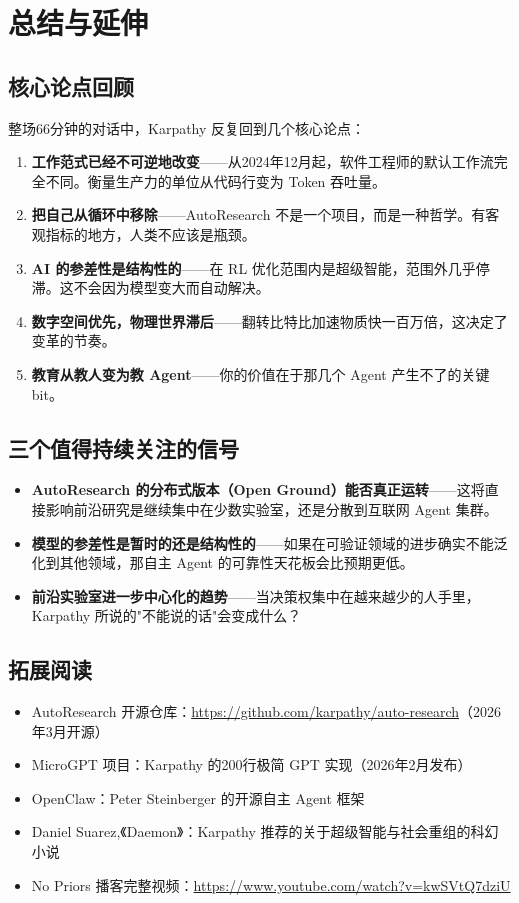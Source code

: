 \section{总结与延伸}

\subsection{核心论点回顾}

整场66分钟的对话中，Karpathy 反复回到几个核心论点：

\begin{enumerate}
    \item \textbf{工作范式已经不可逆地改变}——从2024年12月起，软件工程师的默认工作流完全不同。衡量生产力的单位从代码行变为 Token 吞吐量。
    \item \textbf{把自己从循环中移除}——AutoResearch 不是一个项目，而是一种哲学。有客观指标的地方，人类不应该是瓶颈。
    \item \textbf{AI 的参差性是结构性的}——在 RL 优化范围内是超级智能，范围外几乎停滞。这不会因为模型变大而自动解决。
    \item \textbf{数字空间优先，物理世界滞后}——翻转比特比加速物质快一百万倍，这决定了变革的节奏。
    \item \textbf{教育从教人变为教 Agent}——你的价值在于那几个 Agent 产生不了的关键 bit。
\end{enumerate}

\subsection{三个值得持续关注的信号}

\begin{itemize}
    \item \textbf{AutoResearch 的分布式版本（Open Ground）能否真正运转}——这将直接影响前沿研究是继续集中在少数实验室，还是分散到互联网 Agent 集群。
    \item \textbf{模型的参差性是暂时的还是结构性的}——如果在可验证领域的进步确实不能泛化到其他领域，那自主 Agent 的可靠性天花板会比预期更低。
    \item \textbf{前沿实验室进一步中心化的趋势}——当决策权集中在越来越少的人手里，Karpathy 所说的"不能说的话"会变成什么？
\end{itemize}

\subsection{拓展阅读}

\begin{itemize}
    \item AutoResearch 开源仓库：\url{https://github.com/karpathy/auto-research}（2026年3月开源）
    \item MicroGPT 项目：Karpathy 的200行极简 GPT 实现（2026年2月发布）
    \item OpenClaw：Peter Steinberger 的开源自主 Agent 框架
    \item Daniel Suarez,《Daemon》：Karpathy 推荐的关于超级智能与社会重组的科幻小说
    \item No Priors 播客完整视频：\url{https://www.youtube.com/watch?v=kwSVtQ7dziU}
\end{itemize}



